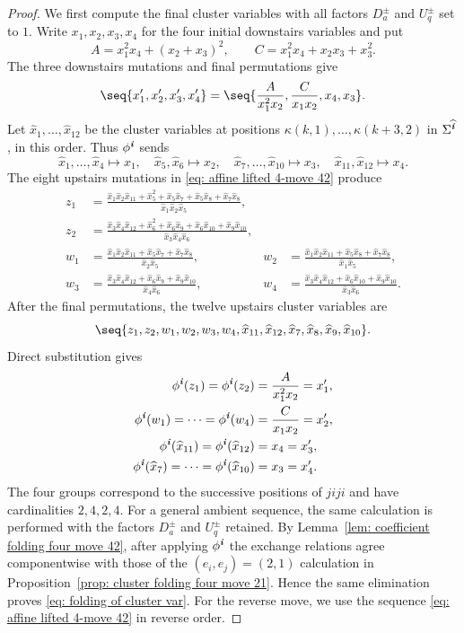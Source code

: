 \documentclass[12pt, leqno]{amsart}
\numberwithin{equation}{section}
\theoremstyle{plain}
\theoremstyle{definition}
\newcommand{\ii}{ \textbf{\textit{i}}}
\newcommand{\hx}{\widehat{x}}
\newcommand{\hii}{{\widehat{\ii}}}
\begin{document}
\begin{proof}
We first compute  the final cluster variables  with all factors $D_a^\pm$ and
$U_q^\pm$ set to $1$. Write $x_1,x_2,x_3,x_4$ for  the four initial downstairs variables  and put
\[
 A=x_1^2x_4+(x_2+x_3)^2,\qquad
 C=x_1^2x_4+x_2x_3+x_3^2.
\]
 The three downstairs mutations and final permutations give
\[
 \seq{x'_1,x'_2,x'_3,x'_4}
 =\seq{\frac{A}{x_1^2x_2},
        \frac{C}{x_1x_2},x_4,x_3}.
\]
  Let $\hx_1,\ldots,\hx_{12}$ be the cluster variables at positions $\kappa(k,1),\ldots,\kappa(k+3,2)$ in $\Sigma^\hii$, in this order.   Thus $\phi^\ii$ sends
\[
 \hx_1,\ldots,\hx_4\mapsto x_1,\quad
 \hx_5,\hx_6\mapsto x_2,\quad
 \hx_7,\ldots,\hx_{10}\mapsto x_3,\quad
 \hx_{11},\hx_{12}\mapsto x_4.
\]
The eight upstairs mutations in
\eqref{eq: affine lifted 4-move 42} produce
\[
\begin{aligned}
 z_1&=\frac{\hx_1\hx_2\hx_{11}+\hx_5^2+
 \hx_5\hx_7+\hx_5\hx_8+\hx_7\hx_8}
 {\hx_1\hx_2\hx_5},\\
 z_2&=\frac{\hx_3\hx_4\hx_{12}+\hx_6^2+
 \hx_6\hx_9+\hx_6\hx_{10}+\hx_9\hx_{10}}
 {\hx_3\hx_4\hx_6},\\
 w_1&=\frac{\hx_1\hx_2\hx_{11}+\hx_5\hx_7+\hx_7\hx_8}
 {\hx_2\hx_5},
&w_2&=\frac{\hx_1\hx_2\hx_{11}+\hx_5\hx_8+\hx_7\hx_8}
 {\hx_1\hx_5},\\
 w_3&=\frac{\hx_3\hx_4\hx_{12}+\hx_6\hx_9+\hx_9\hx_{10}}
 {\hx_4\hx_6},
&w_4&=\frac{\hx_3\hx_4\hx_{12}+\hx_6\hx_{10}+\hx_9\hx_{10}}
 {\hx_3\hx_6}.
\end{aligned}
\]
 After the final permutations, the twelve upstairs cluster variables are{}
\[
 \seq{z_1,z_2,w_1,w_2,w_3,w_4,
       \hx_{11},\hx_{12},
       \hx_7,\hx_8,\hx_9,\hx_{10}}.
\]
Direct substitution gives
\[
\begin{aligned}
 \phi^\ii(z_1)=\phi^\ii(z_2)&=\frac{A}{x_1^2x_2}=x'_1,\\
 \phi^\ii(w_1)=\cdots=\phi^\ii(w_4)&=\frac{C}{x_1x_2}=x'_2,\\
 \phi^\ii(\hx_{11})=\phi^\ii(\hx_{12})&=x_4=x'_3,\\
 \phi^\ii(\hx_7)=\cdots=\phi^\ii(\hx_{10})&=x_3=x'_4.
\end{aligned}
\]
 The four groups correspond to the successive positions of $jiji$
and have cardinalities $2,4,2,4$. For a general ambient sequence, the same calculation is performed 
with the factors $D_a^\pm$ and $U_q^\pm$ retained. By Lemma~\ref{lem: coefficient folding four move 42}, after applying
$\phi^\ii$ the exchange relations agree componentwise with those of the $(e_i,e_j)=(2,1)$ calculation in
Proposition~\ref{prop: cluster folding four move 21}. Hence the same elimination proves
  \eqref{eq: folding of cluster var}.
 For the reverse move, we use  the sequence \eqref{eq: affine lifted 4-move 42} in reverse order.
\end{proof}
\end{document}
